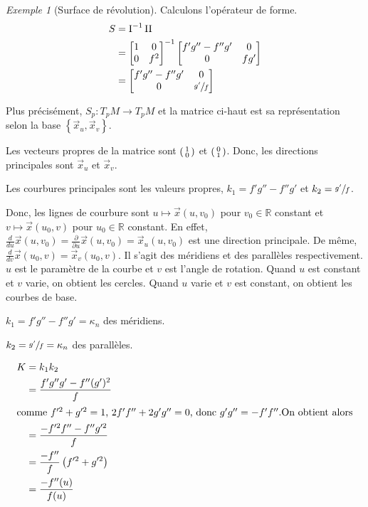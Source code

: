 \documentclass{report}
\theoremstyle{definition}
\theoremstyle{remark}
\newtheorem*{exem}{Exemple}
\def\RR{\mathbb{R}}
\def\pff{\operatorname{I}}
\def\dff{\operatorname{II}}
\begin{document}
\begin{exem}[Surface de r\'evolution]
		Calculons l'op\'erateur de forme.
		\begin{align*}
			S&= \pff^{-1}\dff\\
			&= \begin{bmatrix}
				1&0\\0&f^2
			\end{bmatrix}^{-1} \begin{bmatrix}
				f'g''-f''g'&0\\0&fg'
			\end{bmatrix}\\
			&= \begin{bmatrix}
				f'g''-f''g'&0\\0&\sfrac{g'}{f}
			\end{bmatrix}
		\end{align*}

		Plus pr\'ecis\'ement, $S_p:T_pM\to T_pM$ et la matrice ci-haut est sa repr\'esentation selon la base $\left\{ \vec x_u, \vec x_v \right\}$.

		Les vecteurs propres de la matrice sont $\begin{psmallmatrix}
			1\\0
		\end{psmallmatrix}$ et $\begin{psmallmatrix}
			0\\1
		\end{psmallmatrix}$. Donc, les directions principales sont $\vec x_u$ et $\vec x_v$.

		Les courbures principales sont les valeurs propres, $k_1=f'g''-f''g'$ et $k_2=\sfrac{g'}{f}$.

		Donc, les lignes de courbure sont $u\mapsto\vec x(u,v_0)$ pour $v_0\in\RR$ constant et $v\mapsto\vec x(u_0,v)$ pour $u_0\in\RR$ constant. En effet, $\frac{d}{du}\vec x(u,v_0) = \frac{\partial}{\partial u}\vec x(u,v_0) = \vec x_u(u,v_0)$ est une direction principale. De m\^eme, $\frac{d}{dv}\vec x(u_0,v) = \vec x_v(u_0,v)$. Il s'agit des m\'eridiens et des parall\`eles respectivement. $u$ est le param\`etre de la courbe et $v$ est l'angle de rotation. Quand $u$ est constant et $v$ varie, on obtient les cercles. Quand $u$ varie et $v$ est constant, on obtient les courbes de base.

		$k_1=f'g''-f''g'=\kappa_n$ des m\'eridiens.

		$k_2=\sfrac{g'}{f}=\kappa_n$ des parall\`eles.

		\begin{align*}
			K&= k_1k_2\\
			&= \frac{f'g''g'-f''(g')^2}{f}\\
			\shortintertext{comme $f'^2+g'^2=1$, $2f'f''+2g'g''=0$, donc $g'g''=-f'f''$.On obtient alors}
			&= \frac{-f'^2f''-f''g'^2}{f}\\
			&= \frac{-f''}{f}\left(f'^2+g'^2\right)\\
			&= \frac{-f''(u)}{f(u)}
		\end{align*}
	\end{exem}
\end{document}
